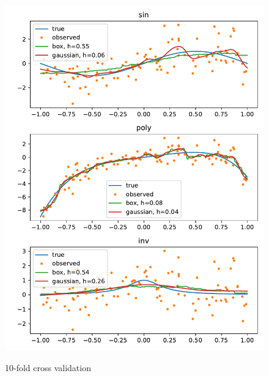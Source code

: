 \documentclass[letterpaper]{article}
\begin{document}
\begin{enumerate}[(a)]
  \begin{figure}
    \caption{10-fold cross validation}
    \includegraphics{cv_kernel_regression_10.pdf}
    \label{fig:10fold}
  \end{figure}


\end{enumerate}
\end{document}
